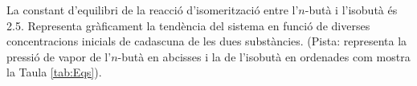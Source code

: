 \begin{exr}
La constant d'equilibri de la reacció d'isomerització entre l'$n$-butà i l'isobutà és 2.5. Representa gràficament la tendència del sistema en funció de diverses concentracions inicials de cadascuna de les dues substàncies. (Pista: representa la pressió de vapor de l'$n$-butà en abcisses i la de l'isobutà en ordenades com mostra la Taula \ref{tab:Eqs}).
\end{exr}